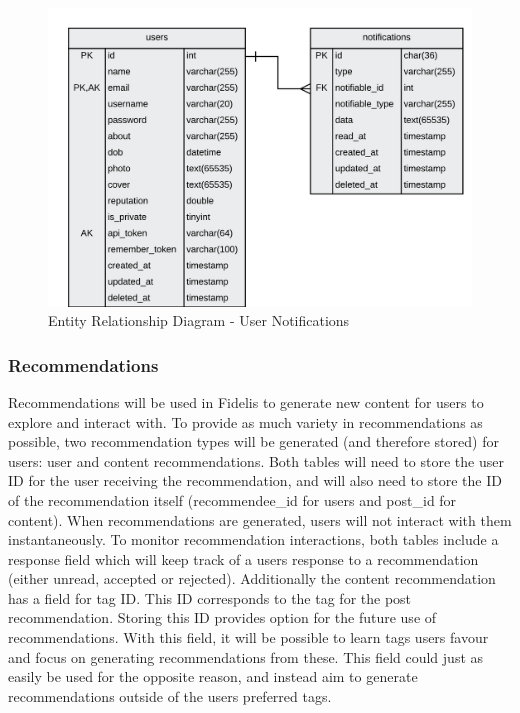 \begin{figure}[H]
  \centering
  \includegraphics[width=1.0\textwidth]{Images/Design/Database/Notifications}
  \caption{Entity Relationship Diagram - User Notifications} \label{fig:ERD_Notifications}
\end{figure}

\subsubsection{Recommendations}
Recommendations will be used in Fidelis to generate new content for users to explore and interact with. To provide as much variety in recommendations as possible, two recommendation types will be generated (and therefore stored) for users: user and content recommendations. Both tables will need to store the user ID for the user receiving the recommendation, and will also need to store the ID of the recommendation itself (recommendee\_id for users and post\_id for content). When recommendations are generated, users will not interact with them instantaneously. To monitor recommendation interactions, both tables include a response field which will keep track of a users response to a recommendation (either unread, accepted or rejected). Additionally the content recommendation has a field for tag ID. This ID corresponds to the tag for the post recommendation. Storing this ID provides option for the future use of recommendations. With this field, it will be possible to learn tags users favour and focus on generating recommendations from these. This field could just as easily be used for the opposite reason, and instead aim to generate recommendations outside of the users preferred tags.

